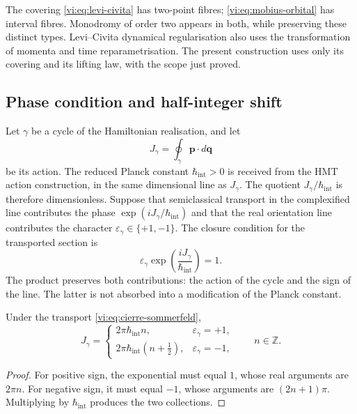 The covering \eqref{vi:eq:levi-civita} has two-point
fibres; \eqref{vi:eq:mobius-orbital} has interval
fibres. Monodromy of order two appears in both,
while preserving these distinct types. Levi--Civita dynamical
regularisation also uses the transformation
of momenta and time reparametrisation. The present
construction uses only its covering and its lifting
law, with the scope just proved.

\subsection{Phase condition and half-integer shift}
\label{vi:subsec:sommerfeld}

Let $\gamma$ be a cycle of the Hamiltonian realisation, and let
\begin{equation}
 J_\gamma=\oint_\gamma\mathbf p\cdot d\mathbf q
 \label{vi:eq:accion-ciclo}
\end{equation}
be its action. The reduced Planck constant
$\hbar_{\mathrm{int}}>0$ is received from the HMT
action construction, in the same dimensional line as $J_\gamma$.
The quotient $J_\gamma/\hbar_{\mathrm{int}}$ is therefore
dimensionless. Suppose that semiclassical transport in the
complexified line contributes the phase
$\exp(iJ_\gamma/\hbar_{\mathrm{int}})$ and that the real
orientation line contributes the character
$\varepsilon_\gamma\in\{+1,-1\}$. The closure condition
for the transported section is
\begin{equation}
 \varepsilon_\gamma
       \exp\!\left(\frac{iJ_\gamma}{\hbar_{\mathrm{int}}}\right)=1.
 \label{vi:eq:cierre-sommerfeld}
\end{equation}
The product preserves both contributions: the action of the
cycle and the sign of the line. The latter is not absorbed into a
modification of the Planck constant.

\begin{theorem}
\label{vi:thm:sommerfeld}
Under the transport \eqref{vi:eq:cierre-sommerfeld},
\begin{equation}
 J_\gamma=
 \begin{cases}
  2\pi\hbar_{\mathrm{int}}n,
          &\varepsilon_\gamma=+1,\\[1mm]
  2\pi\hbar_{\mathrm{int}}(n+\tfrac12),
          &\varepsilon_\gamma=-1,
 \end{cases}
 \qquad n\in\mathbb Z.
 \label{vi:eq:accion-sommerfeld}
\end{equation}
\end{theorem}
\begin{proof}
For positive sign, the exponential must equal $1$, whose
real arguments are $2\pi n$. For negative sign, it must
equal $-1$, whose arguments are $(2n+1)\pi$. Multiplying
by $\hbar_{\mathrm{int}}$ produces the two collections.
\end{proof}

